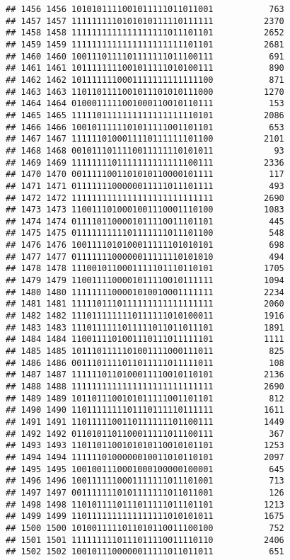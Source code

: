 \documentclass[]{article}
\begin{document}
\begin{verbatim}
## 1456 1456 1010101111001011111011011001           763
## 1457 1457 1111111110101010111110111111          2370
## 1458 1458 1111111111111111111011101101          2652
## 1459 1459 1111111111111111111111101101          2681
## 1460 1460 1001110111101111111011100111           691
## 1461 1461 1011111111001011111010100111           890
## 1462 1462 1011111110001111111111111100           871
## 1463 1463 1101101111001011101010111000          1270
## 1464 1464 0100011111001000110010110111           153
## 1465 1465 1111101111111111111111110101          2086
## 1466 1466 1001011111101011111001101101           653
## 1467 1467 1111110100011110111111101100          2101
## 1468 1468 0010111011110011111110101011            93
## 1469 1469 1111111101111111111111100111          2336
## 1470 1470 0011111001101010110000101111           117
## 1471 1471 0111111100000011111011101111           493
## 1472 1472 1111111111111111111111111111          2690
## 1473 1473 1100111010001001110001110100          1083
## 1474 1474 0111101100001011110011101101           445
## 1475 1475 0111111111101111111011101100           548
## 1476 1476 1001111010100011111101010101           698
## 1477 1477 0111111100000011111110101010           494
## 1478 1478 1110010110001111101110110101          1705
## 1479 1479 1100111100001011110010111111          1094
## 1480 1480 1111111100001010010001111111          2234
## 1481 1481 1111101110111111111111111111          2060
## 1482 1482 1110111111110111111010100011          1916
## 1483 1483 1110111111011111011011011101          1891
## 1484 1484 1100111101001110111011111101          1111
## 1485 1485 1011101111101001111000111011           825
## 1486 1486 0011101111011011111011111011           108
## 1487 1487 1111110110100011110010110101          2136
## 1488 1488 1111111111111111111111111111          2690
## 1489 1489 1011011100101011111001101101           812
## 1490 1490 1101111111101110111110111111          1611
## 1491 1491 1101111100110111111101100111          1449
## 1492 1492 0110101101100011111011100111           367
## 1493 1493 1101101100101010110010101101          1253
## 1494 1494 1111110100000010011010110101          2097
## 1495 1495 1001001110001000100000100001           645
## 1496 1496 1001111110001111111011101001           713
## 1497 1497 0011111110101111111011011001           126
## 1498 1498 1101011110111011111011101101          1213
## 1499 1499 1101111111111111111010101011          1675
## 1500 1500 1010011111011010110011100100           752
## 1501 1501 1111111110111011110011110110          2406
## 1502 1502 1001011100000011111011011011           651

\end{verbatim}
\end{document}
